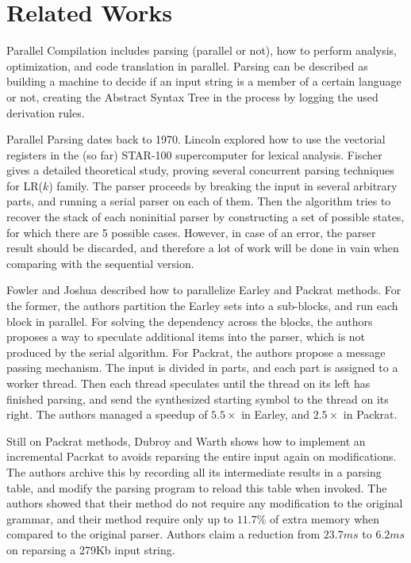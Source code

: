 \documentclass[runningheads]{llncs}
\begin{document}
\section{Related Works} \label{sec:related}

Parallel Compilation includes parsing (parallel or not), how to perform
analysis, optimization, and code translation in parallel.  Parsing can be
described as building a machine to decide if an input string is a member of a
certain language or not, creating the Abstract Syntax Tree in the process by
logging the used derivation rules.

Parallel Parsing dates back to 1970. Lincoln \cite{Lincoln:1970:PPT:987475.987478}
explored how to use the vectorial registers in the (so far)
STAR-100 supercomputer for lexical analysis. Fischer
\cite{fischer1975parsing} gives a detailed theoretical study, proving
several concurrent parsing techniques for LR($k$) family.
The parser proceeds by breaking the input in several arbitrary parts, and running a
serial parser on each of them. Then the algorithm tries to
recover the stack of each noninitial parser by constructing a set of
possible states, for which there are 5 possible cases. However, in case
of an error, the parser result should be discarded, and therefore a lot
of work will be done in vain when comparing with the sequential version.

Fowler and Joshua \cite{fowler2009parallel} described how to parallelize Earley
and Packrat methods. For the former, the authors partition the Earley sets into
a sub-blocks, and run each block in parallel. For solving the dependency across
the blocks, the authors proposes a way to speculate additional items into the
parser, which is not produced by the serial algorithm. For Packrat, the authors
propose a message passing mechanism.  The input is divided in parts, and each
part is assigned to a worker thread.  Then each thread speculates until the
thread on its left has finished parsing, and send the synthesized starting
symbol to the thread on its right. The authors managed a speedup of $5.5\times$
in Earley, and $2.5\times$ in Packrat.

Still on Packrat methods, Dubroy and Warth \cite{dubroy2017incremental} shows
how to implement an incremental Pacrkat to avoids reparsing the entire input
again on modifications. The authors archive this by recording all its
intermediate results in a parsing table, and modify the parsing program to reload
this table when invoked. The authors showed that their method do not require
any modification to the original grammar, and their method require only
up to $11.7\%$ of extra memory when compared to the original parser. Authors
claim a reduction from $23.7ms$ to $6.2ms$ on reparsing a 279Kb input string.
\end{document}
